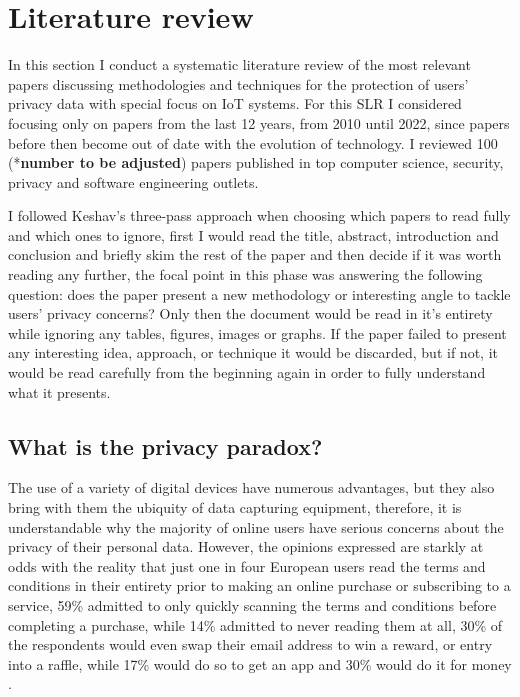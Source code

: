 \documentclass[conference]{IEEEtran}
\begin{document}
\section{Literature review}

In this section I conduct a systematic literature review of the most relevant papers
discussing methodologies and techniques for the protection of users' privacy data
with special focus on IoT systems. For this SLR I considered focusing only
on papers from the last 12 years, from 2010 until 2022, since papers before then
become out of date with the evolution of technology. I reviewed 100 (*\textbf{\color{red}number to be adjusted}) papers published
in top computer science, security, privacy and software engineering outlets.

I followed Keshav's three-pass approach \cite{KeshavHow} when choosing which
papers to read fully and which ones to ignore, first I would read the title, abstract,
introduction and conclusion and briefly skim the rest of the paper and then
decide if it was worth reading any further, the focal point in this phase was
answering the following question: does the paper present a new methodology or
interesting angle to tackle users' privacy concerns? Only then the document would
be read in it's entirety while ignoring any tables, figures, images or graphs.
If the paper failed to present any interesting idea, approach, or
technique it would be discarded, but if not, it would be read carefully from
the beginning again in order to fully understand what it presents.

\subsection{What is the privacy paradox?}

The use of a variety of digital devices have numerous advantages, but
they also bring with them the ubiquity of data capturing equipment, therefore,
it is understandable why the majority of online users have serious concerns
about the privacy of their personal data. However, the opinions expressed
are starkly at odds with the reality that just one in four European users
read the terms and conditions in their entirety prior to making an online
purchase or subscribing to a service, 59\% admitted to only quickly scanning
the terms and conditions before completing a purchase, while 14\% admitted
to never reading them at all, 30\% of the respondents would even swap
their email address to win a reward, or entry into a raffle, while 17\% would
do so to get an app and 30\% would do it for money \cite{DarrenState}.
\end{document}
